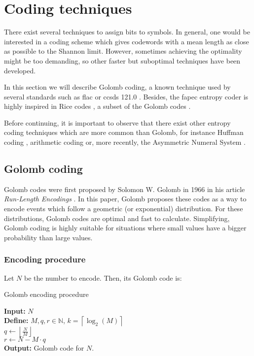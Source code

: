 \section{Coding techniques}
There exist several techniques to assign bits to symbols. In general, one would be interested in a coding scheme which gives codewords with a mean length as close as possible to the Shannon limit. However, sometimes achieving the optimality might be too demanding, so other faster but suboptimal techniques have been developed.

In this section we will describe Golomb coding, a known technique used by several standards such as \acrshort{flac} \parencite{FLAC} or \acrshort{ccsds} 121.0 \parencite{ccsds121}. Besides, the \acrshort{fapec} entropy coder \parencite{PaperFAPEC} is highly inspired in Rice codes \parencite{RiceCodes}, a subset of the Golomb codes \parencite{Golomb1966}.

Before continuing, it is important to observe that there exist other entropy coding techniques which are more common than Golomb, for instance Huffman coding \parencite{cover}, arithmetic coding \parencite{MacKay} or, more recently, the Asymmetric Numeral System \parencite{ans}.

\subsection{Golomb coding} \label{golomb-coding}
Golomb codes were first proposed by Solomon W. Golomb in 1966 in his article \textit{Run-Length Encodings} \parencite{Golomb1966}. In this paper, Golomb proposes these codes as a way to encode events which follow a geometric (or exponential) distribution. For these distributions, Golomb codes are optimal \parencite{OptimalRice} \parencite{OptimalGeometric} and fast to calculate. Simplifying, Golomb coding is highly suitable for situations where small values have a bigger probability than large values.

\subsubsection{Encoding procedure}
Let $N$ be the number to encode. Then, its Golomb code is:

\begin{algorithm}[H]
	\caption{Golomb encoding procedure}
	\SetAlgoLined
	\textbf{Input:} $N$\\
	\textbf{Define:} $M,q,r \in \mathbb{N}$, \quad $k = \left\lceil \log_2(M) \right\rceil$\\
	$q \gets \left\lfloor \frac{N}{M} \right\rfloor$\\
	$r \gets N - M \cdot q$\\
	\textbf{Output:} Golomb code for $N$.
\end{algorithm}

